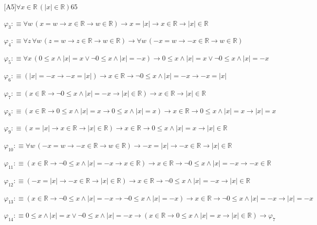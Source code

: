 \begin{fullproof}{[A5]}{$\forall x \in \mathbb{R}\,(\lvert x \rvert \in \mathbb{R})$}{65}
\begin{abbrevlist}
\item $\varphi_{3} :\equiv \forall w\,(x = w \to x \in \mathbb{R} \to w \in \mathbb{R}) \to x = \lvert x \rvert \to x \in \mathbb{R} \to \lvert x \rvert \in \mathbb{R}$
\item $\varphi_{4} :\equiv \forall z\,\forall w\,(z = w \to z \in \mathbb{R} \to w \in \mathbb{R}) \to \forall w\,(-x = w \to -x \in \mathbb{R} \to w \in \mathbb{R})$
\item $\varphi_{5} :\equiv \forall x\,(0 \leq x \land \lvert x \rvert = x \lor \neg 0 \leq x \land \lvert x \rvert = -x) \to 0 \leq x \land \lvert x \rvert = x \lor \neg 0 \leq x \land \lvert x \rvert = -x$
\item $\varphi_{6} :\equiv (\lvert x \rvert = -x \to -x = \lvert x \rvert) \to x \in \mathbb{R} \to \neg 0 \leq x \land \lvert x \rvert = -x \to -x = \lvert x \rvert$
\item $\varphi_{7} :\equiv (x \in \mathbb{R} \to \neg 0 \leq x \land \lvert x \rvert = -x \to \lvert x \rvert \in \mathbb{R}) \to x \in \mathbb{R} \to \lvert x \rvert \in \mathbb{R}$
\item $\varphi_{8} :\equiv (x \in \mathbb{R} \to 0 \leq x \land \lvert x \rvert = x \to 0 \leq x \land \lvert x \rvert = x) \to x \in \mathbb{R} \to 0 \leq x \land \lvert x \rvert = x \to \lvert x \rvert = x$
\item $\varphi_{9} :\equiv (x = \lvert x \rvert \to x \in \mathbb{R} \to \lvert x \rvert \in \mathbb{R}) \to x \in \mathbb{R} \to 0 \leq x \land \lvert x \rvert = x \to \lvert x \rvert \in \mathbb{R}$
\item $\varphi_{10} :\equiv \forall w\,(-x = w \to -x \in \mathbb{R} \to w \in \mathbb{R}) \to -x = \lvert x \rvert \to -x \in \mathbb{R} \to \lvert x \rvert \in \mathbb{R}$
\item $\varphi_{11} :\equiv (x \in \mathbb{R} \to \neg 0 \leq x \land \lvert x \rvert = -x \to x \in \mathbb{R}) \to x \in \mathbb{R} \to \neg 0 \leq x \land \lvert x \rvert = -x \to -x \in \mathbb{R}$
\item $\varphi_{12} :\equiv (-x = \lvert x \rvert \to -x \in \mathbb{R} \to \lvert x \rvert \in \mathbb{R}) \to x \in \mathbb{R} \to \neg 0 \leq x \land \lvert x \rvert = -x \to \lvert x \rvert \in \mathbb{R}$
\item $\varphi_{13} :\equiv (x \in \mathbb{R} \to \neg 0 \leq x \land \lvert x \rvert = -x \to \neg 0 \leq x \land \lvert x \rvert = -x) \to x \in \mathbb{R} \to \neg 0 \leq x \land \lvert x \rvert = -x \to \lvert x \rvert = -x$
\item $\varphi_{14} :\equiv 0 \leq x \land \lvert x \rvert = x \lor \neg 0 \leq x \land \lvert x \rvert = -x \to (x \in \mathbb{R} \to 0 \leq x \land \lvert x \rvert = x \to \lvert x \rvert \in \mathbb{R}) \to \varphi_{7}$

\end{abbrevlist}
\end{fullproof}
